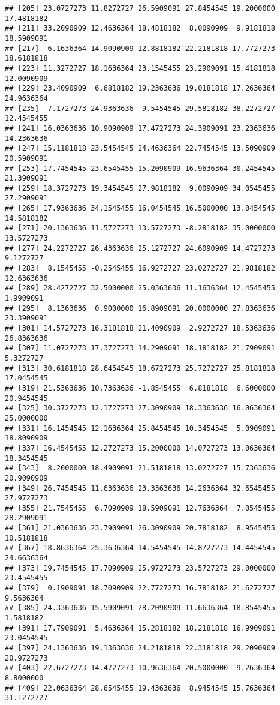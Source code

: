 \documentclass[]{book}
\begin{document}
\begin{verbatim}
## [205] 23.0727273 11.8272727 26.5909091 27.8454545 19.2000000 17.4818182
## [211] 33.2090909 12.4636364 18.4818182  8.0090909  9.9181818 18.5909091
## [217]  6.1636364 14.9090909 12.8818182 22.2181818 17.7727273 18.6181818
## [223] 11.3272727 18.1636364 23.1545455 23.2909091 15.4181818 12.0090909
## [229] 23.4090909  6.6818182 19.2363636 19.0181818 17.2636364 24.9636364
## [235]  7.1727273 24.9363636  9.5454545 29.5818182 38.2272727 12.4545455
## [241] 16.0363636 10.9090909 17.4727273 24.3909091 23.2363636 14.2363636
## [247] 15.1181818 23.5454545 24.4636364 22.7454545 13.5090909 20.5909091
## [253] 17.7454545 23.6545455 15.2090909 16.9636364 30.2454545 21.3909091
## [259] 18.3727273 19.3454545 27.9818182  9.0090909 34.0545455 27.2909091
## [265] 17.9363636 34.1545455 16.0454545 16.5000000 13.0454545 14.5818182
## [271] 20.1363636 11.5727273 13.5727273 -8.2818182 35.0000000 13.5727273
## [277] 24.2272727 26.4363636 25.1272727 24.6090909 14.4727273  9.1272727
## [283]  8.1545455 -0.2545455 16.9272727 23.0272727 21.9818182 12.6363636
## [289] 28.4272727 32.5000000 25.0363636 11.1636364 12.4545455  1.9909091
## [295]  8.1363636  0.9000000 16.8909091 20.0000000 27.8363636 23.3909091
## [301] 14.5727273 16.3181818 21.4090909  2.9272727 18.5363636 26.8363636
## [307] 11.0727273 17.3727273 14.2909091 18.1818182 21.7909091  5.3272727
## [313] 30.6181818 28.6454545 18.6727273 25.7272727 25.8181818 17.0454545
## [319] 21.5363636 10.7363636 -1.8545455  6.8181818  6.6000000 20.9454545
## [325] 30.3727273 12.1727273 27.3090909 18.3363636 16.0636364 25.0000000
## [331] 16.1454545 12.1636364 25.8454545 10.3454545  5.0909091 18.8090909
## [337] 16.4545455 12.2727273 15.2000000 14.0727273 13.0636364 18.3454545
## [343]  8.2000000 18.4909091 21.5181818 13.0272727 15.7363636 20.9090909
## [349] 26.7454545 11.6363636 23.3363636 14.2636364 32.6545455 27.9727273
## [355] 21.7545455  6.7090909 18.5909091 12.7636364  7.0545455 28.2909091
## [361] 21.0363636 23.7909091 26.3090909 20.7818182  8.9545455 10.5181818
## [367] 18.8636364 25.3636364 14.5454545 14.8727273 14.4454545 24.6636364
## [373] 19.7454545 17.7090909 25.9727273 23.5727273 29.0000000 23.4545455
## [379]  0.1909091 18.7090909 22.7727273 16.7818182 21.6272727  9.5636364
## [385] 24.3363636 15.5909091 28.2090909 11.6636364 18.8545455  1.5818182
## [391] 17.7909091  5.4636364 15.2818182 18.2181818 16.9909091 23.0454545
## [397] 24.1363636 19.1363636 24.2181818 22.3181818 29.2090909 20.9727273
## [403] 22.6727273 14.4727273 10.9636364 20.5000000  9.2636364  8.8000000
## [409] 22.0636364 28.6545455 19.4363636  8.9454545 15.7636364 31.1272727

\end{verbatim}
\end{document}
